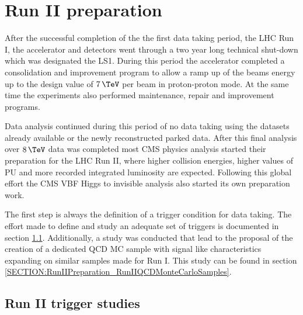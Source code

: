 \chapter{Run II preparation}
\label{CHAPTER:RunIIPreparation}

\glsresetall %


After the successful completion of the the first data taking period, the \gls{LHC} Run I, the accelerator and detectors went through a two year long technical shut-down which was designated the \gls{LS1}. During this period the accelerator completed a consolidation and improvement program to allow a ramp up of the beams energy up to the design value of $7\,\TeV$ per beam in proton-proton mode. At the same time the experiments also performed maintenance, repair and improvement programs. 

Data analysis continued during this period of no data taking using the datasets already available or the newly reconstructed parked data. After this final analysis over $8\,\TeV$ data was completed most \gls{CMS} physics analysis started their preparation for the \gls{LHC} Run II, where higher collision energies, higher values of \gls{PU} and more recorded integrated luminosity are expected. Following this global effort the \gls{CMS} \gls{VBF} Higgs to invisible analysis also started its own preparation work. 

The first step is always the definition of a trigger condition for data taking. The effort made to define and study an adequate set of triggers is documented in section \ref{SECTION:RunIITriggerStudies}. Additionally, a study was conducted that lead to the proposal of the creation of a dedicated \gls{QCD} \gls{MC} sample with signal like characteristics expanding on similar samples made for Run I. This study can be found in section \ref{SECTION:RunIIPreparation_RunIIQCDMonteCarloSamples}.

\section{Run II trigger studies}
\label{SECTION:RunIITriggerStudies}

% 
%

